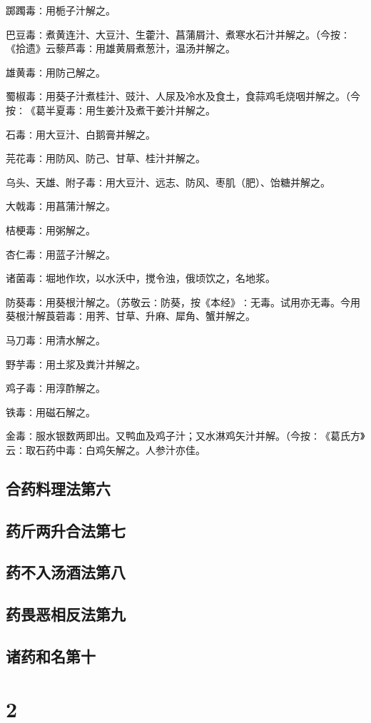 \documentclass[a4paper,12pt,UTF8,twoside]{ctexbook}
\begin{document}
踯躅毒∶用栀子汁解之。

巴豆毒∶煮黄连汁、大豆汁、生藿汁、菖蒲屑汁、煮寒水石汁并解之。（今按∶《拾遗》云藜芦毒∶用雄黄屑煮葱汁，温汤并解之。

雄黄毒∶用防己解之。

蜀椒毒∶用葵子汁煮桂汁、豉汁、人尿及冷水及食土，食蒜鸡毛烧咽并解之。（今按∶《葛半夏毒∶用生姜汁及煮干姜汁并解之。

石毒∶用大豆汁、白鹅膏并解之。

芫花毒∶用防风、防己、甘草、桂汁并解之。

乌头、天雄、附子毒∶用大豆汁、远志、防风、枣肌（肥）、饴糖并解之。

大戟毒∶用菖蒲汁解之。

桔梗毒∶用粥解之。

杏仁毒∶用蓝子汁解之。

诸菌毒∶堀地作坎，以水沃中，搅令浊，俄顷饮之，名地浆。

防葵毒∶用葵根汁解之。（苏敬云∶防葵，按《本经》∶无毒。试用亦无毒。今用葵根汁解莨菪毒∶用荠、甘草、升麻、犀角、蟹并解之。

马刀毒∶用清水解之。

野芋毒∶用土浆及粪汁并解之。

鸡子毒∶用淳酢解之。

铁毒∶用磁石解之。

金毒∶服水银数两即出。又鸭血及鸡子汁；又水淋鸡矢汁并解。（今按∶《葛氏方》云∶取石药中毒∶白鸡矢解之。人参汁亦佳。

\chapter{合药料理法第六}
\chapter{药斤两升合法第七}
\chapter{药不入汤酒法第八}
\chapter{药畏恶相反法第九}
\chapter{诸药和名第十}

\part{2}
\end{document}
